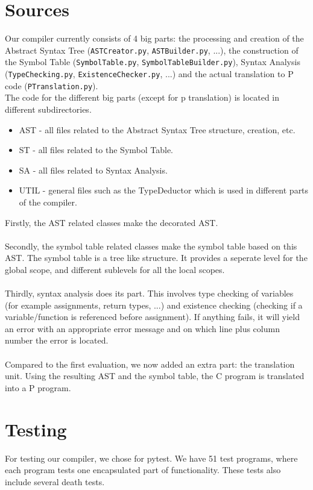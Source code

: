 \documentclass{article}
\begin{document}
\section{Sources}
Our compiler currently consists of 4 big parts: the processing and creation of the Abstract Syntax Tree (\texttt{ASTCreator.py}, \texttt{ASTBuilder.py}, ...), the construction of the Symbol Table (\texttt{SymbolTable.py}, \texttt{SymbolTableBuilder.py}), Syntax Analysis (\texttt{TypeChecking.py}, \texttt{ExistenceChecker.py}, ...) and the actual translation to P code (\texttt{PTranslation.py}).
\\
The code for the different big parts (except for p translation) is located in different subdirectories. \\
\begin{itemize}
	\item AST - all files related to the Abstract Syntax Tree structure, creation, etc.
	\item ST - all files related to the Symbol Table.
	\item SA - all files related to Syntax Analysis.
	\item UTIL - general files such as the TypeDeductor which is used in different parts of the compiler.
\end{itemize}

\newpage
\hfill \break
Firstly, the AST related classes make the decorated AST. \\ \\
Secondly, the symbol table related classes make the symbol table based on this AST. The symbol table is a tree like structure. It provides a seperate level for the global scope, and different sublevels for all the local scopes. \\ \\
Thirdly, syntax analysis does its part. This involves type checking of variables (for example assignments, return types, ...) and existence checking (checking if a variable/function is referenced before assignment). If anything fails, it will yield an error with an appropriate error message and on which line plus column number the error is located. \\ \\
\hfill \break
Compared to the first evaluation, we now added an extra part: the translation unit. Using the resulting AST and the symbol table, the C program is translated into a P program.

\section{Testing}
For testing our compiler, we chose for pytest. We have 51 test programs, where each program tests one encapsulated part of functionality. These tests also include several death tests.
\end{document}
